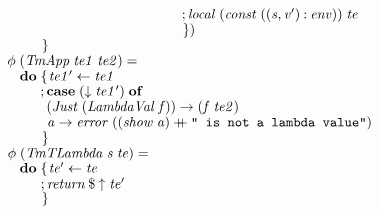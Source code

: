 \documentclass[10pt]{article}
\newcommand{\Conid}[1]{\mathit{#1}}
\newcommand{\Varid}[1]{\mathit{#1}}
\newcommand{\plus}{\mathbin{+\!\!\!+}}
\begin{document}
\begin{tabbing}
${\hskip1.00em\relax\hskip2.00em\relax\phantom{\Varid{\phi}\;\mbox{}}\phantom{\mathbf{do}\;\mbox{}}\phantom{;\Varid{return}\mathbin{\$}\Varid{\uparrow}\mathbin{\$}(\lambda \Varid{v}\to \mathbf{do}\;\mbox{}};\Varid{local}\;(\Varid{const}\;((\Varid{s},\Varid{v'})\mathbin{:}\Varid{env}))\;\Varid{te}}$\\
${\hskip1.00em\relax\hskip2.00em\relax\phantom{\Varid{\phi}\;\mbox{}}\phantom{\mathbf{do}\;\mbox{}}\phantom{;\Varid{return}\mathbin{\$}\Varid{\uparrow}\mathbin{\$}(\lambda \Varid{v}\to \mathbf{do}\;\mbox{}}\mskip1.5mu\})}$\\
${\hskip1.00em\relax\hskip2.00em\relax\phantom{\Varid{\phi}\;\mbox{}}\phantom{\mathbf{do}\;\mbox{}}\mskip1.5mu\}}$\\
${}$\\
${\hskip1.00em\relax\hskip2.00em\relax\Varid{\phi}\;(\Conid{TmApp}\;\Varid{te1}\;\Varid{te2})\mathrel{=}}$\\
${\hskip1.00em\relax\hskip2.00em\relax\phantom{\Varid{\phi}\;\mbox{}}\mathbf{do}\;\{\mskip1.5mu \Varid{te1'}\leftarrow \Varid{te1}}$\\
${\hskip1.00em\relax\hskip2.00em\relax\phantom{\Varid{\phi}\;\mbox{}}\phantom{\mathbf{do}\;\mbox{}};\mathbf{case}\;(\Varid{\downarrow}\;\Varid{te1'})\;\mathbf{of}}$\\
${\hskip1.00em\relax\hskip2.00em\relax\phantom{\Varid{\phi}\;\mbox{}}\phantom{\mathbf{do}\;\mbox{}}\phantom{;\mbox{}}(\Conid{Just}\;(\Conid{LambdaVal}\;\Varid{f}))\to (\Varid{f}\;\Varid{te2})}$\\
${\hskip1.00em\relax\hskip2.00em\relax\phantom{\Varid{\phi}\;\mbox{}}\phantom{\mathbf{do}\;\mbox{}}\phantom{;\mbox{}}\Varid{a}\to \Varid{error}\;((\Varid{show}\;\Varid{a})\plus \text{\tt \char34 ~is~not~a~lambda~value\char34})}$\\
${\hskip1.00em\relax\hskip2.00em\relax\phantom{\Varid{\phi}\;\mbox{}}\phantom{\mathbf{do}\;\mbox{}}\mskip1.5mu\}}$\\
${}$\\
${\hskip1.00em\relax\hskip2.00em\relax\Varid{\phi}\;(\Conid{TmTLambda}\;\Varid{s}\;\Varid{te})\mathrel{=}}$\\
${\hskip1.00em\relax\hskip2.00em\relax\phantom{\Varid{\phi}\;\mbox{}}\mathbf{do}\;\{\mskip1.5mu \Varid{te'}\leftarrow \Varid{te}}$\\
${\hskip1.00em\relax\hskip2.00em\relax\phantom{\Varid{\phi}\;\mbox{}}\phantom{\mathbf{do}\;\mbox{}};\Varid{return}\mathbin{\$}\Varid{\uparrow}\;\Varid{te'}}$\\
${\hskip1.00em\relax\hskip2.00em\relax\phantom{\Varid{\phi}\;\mbox{}}\phantom{\mathbf{do}\;\mbox{}}\mskip1.5mu\}}$\\

\end{tabbing}
\end{document}
